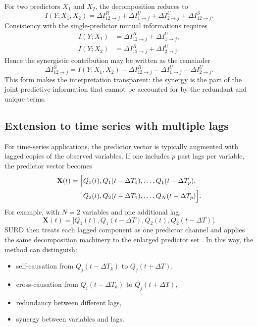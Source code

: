 \documentclass[fleqn,usenatbib]{mnras}
\begin{document}
For two predictors \(X_1\) and \(X_2\), the decomposition reduces to
\begin{equation}
I(Y;X_1,X_2)
=
\Delta I_{12\to j}^{R}
+
\Delta I_{1\to j}^{U}
+
\Delta I_{2\to j}^{U}
+
\Delta I_{12\to j}^{S}.
\label{eq:two_source_total}
\end{equation}
Consistency with the single-predictor mutual informations requires
\begin{align}
I(Y;X_1) &= \Delta I_{12\to j}^{R} + \Delta I_{1\to j}^{U},\\
I(Y;X_2) &= \Delta I_{12\to j}^{R} + \Delta I_{2\to j}^{U}.
\end{align}
Hence the synergistic contribution may be written as the remainder
\begin{equation}
\Delta I_{12\to j}^{S}
=
I(Y;X_1,X_2)
-
\Delta I_{12\to j}^{R}
-
\Delta I_{1\to j}^{U}
-
\Delta I_{2\to j}^{U}.
\end{equation}
This form makes the interpretation transparent: the synergy is the part of the joint predictive information that cannot be accounted for by the redundant and unique terms.

\subsection{Extension to time series with multiple lags}

For time-series applications, the predictor vector is typically augmented with lagged copies of the observed variables. If one includes \(p\) past lags per variable, the predictor vector becomes
\begin{equation}
\begin{split}
\mathbf{X}(t) = \Bigl[ & Q_1(t), Q_1(t-\Delta T_1), \ldots, Q_1(t-\Delta T_p), \\
                       & Q_2(t), Q_2(t-\Delta T_1), \ldots, Q_N(t-\Delta T_p) \Bigr].
\end{split}
\label{eq:lagged_vector_general}
\end{equation}
For example, with \(N=2\) variables and one additional lag,
\begin{equation}
\mathbf{X}(t)=
\bigl[
Q_1(t),Q_1(t-\Delta T),Q_2(t),Q_2(t-\Delta T)
\bigr].
\label{eq:lagged_vector_two}
\end{equation}
SURD then treats each lagged component as one predictor channel and applies the same decomposition machinery to the enlarged predictor set \citep{MartinezSanchez2024SURD}. In this way, the method can distinguish:
\begin{itemize}
    \item self-causation from \(Q_j(t-\Delta T_k)\) to \(Q_j(t+\Delta T)\),
    \item cross-causation from \(Q_i(t-\Delta T_k)\) to \(Q_j(t+\Delta T)\),
    \item redundancy between different lags,
    \item synergy between variables and lags.
\end{itemize}
\end{document}
